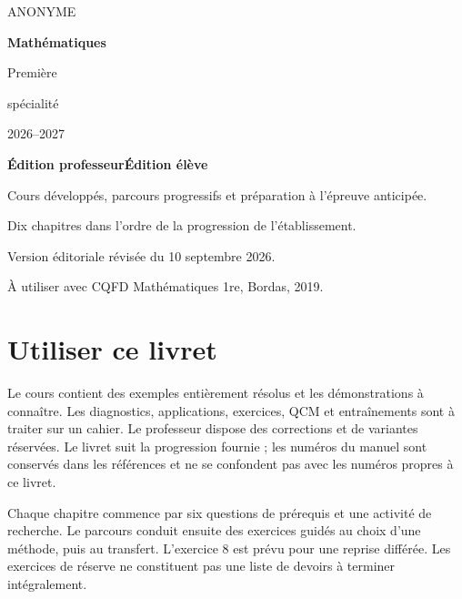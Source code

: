 \begin{titlepage}
\color{bleu}\sffamily
{\large ANONYME\par}
\vspace{22mm}
{\fontsize{35}{40}\selectfont\bfseries Mathématiques\par}
\vspace{6mm}
{\LARGE Première\par spécialité\par}
\vspace{12mm}
{\Large 2026--2027\par}
\vspace{10mm}
\vfill
{\Large\bfseries\ifprof Édition professeur\else Édition élève\fi\par}
\vspace{4mm}
Cours développés, parcours progressifs et préparation à l’épreuve anticipée.\par
Dix chapitres dans l’ordre de la progression de l’établissement.\par
\vspace{8mm}
{\small Version éditoriale révisée du 10 septembre 2026.\par À utiliser avec CQFD Mathématiques 1re, Bordas, 2019.}
\end{titlepage}
\chapter*{Utiliser ce livret}
Le cours contient des exemples entièrement résolus et les démonstrations à connaître. Les diagnostics, applications, exercices, QCM et entraînements sont à traiter sur un cahier. Le professeur dispose des corrections et de variantes réservées. Le livret suit la progression fournie ; les numéros du manuel sont conservés dans les références et ne se confondent pas avec les numéros propres à ce livret.

Chaque chapitre commence par six questions de prérequis et une activité de recherche. Le parcours conduit ensuite des exercices guidés au choix d’une méthode, puis au transfert. L’exercice 8 est prévu pour une reprise différée. Les exercices de réserve ne constituent pas une liste de devoirs à terminer intégralement.


